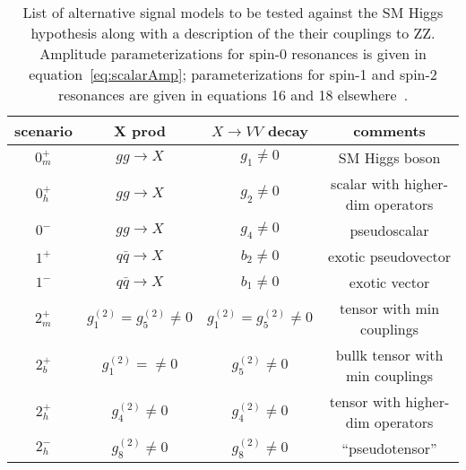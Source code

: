 \begin{table}
\begin{center}
\begin{tabular}{cccc}
\hline 
\hline
scenario & X prod & $X\to VV$ decay & comments \\
\hline
$0_m^+$ & $gg\to X$ & $g_1\neq 0$ & SM Higgs boson \\ 
$0_h^+$ & $gg\to X$ & $g_2\neq 0$ & scalar with higher-dim operators \\ 
$0^-$ & $gg\to X$ & $g_4\neq 0$ & pseudoscalar \\ 
$1^+$ & $q\bar{q}\to X$ & $b_2\neq 0$ & exotic pseudovector\\
$1^-$ & $q\bar{q}\to X$ & $b_1\neq 0$ & exotic vector \\ 
$2_m^+$ & $g_1^{(2)}=g_5^{(2)}\neq 0$ & $g_1^{(2)}=g_5^{(2)}\neq 0$ & tensor with min couplings\\
$2_b^+$ & $g_1^{(2)}=\neq 0$ & $g_5^{(2)}\neq 0$ & bullk tensor with min couplings \\
$2_h^+$ & $g_4^{(2)}\neq 0$ & $g_4^{(2)}\neq 0$ & tensor with higher-dim operators\\
$2_h^-$ & $g_8^{(2)}\neq 0$ & $g_8^{(2)}\neq 0$ & ``pseudotensor''\\ 
\hline
\hline
\end{tabular}
\end{center}
\caption{List of alternative signal models to be tested against the SM Higgs 
hypothesis along with a description of the their couplings to ZZ.  Amplitude
parameterizations for spin-0 resonances is given in equation~\ref{eq:scalarAmp};
parameterizations for spin-1 and spin-2 resonances are given in equations 16 and 18 elsewhere~\cite{Bolognesi:2012mm}.}
\label{table:alternativeModels}
\end{table}


